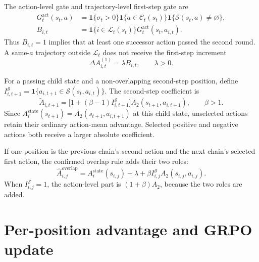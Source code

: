 \documentclass[10pt]{article}
\begin{document}
The action-level gate and trajectory-level first-step gate are
\begin{align}
G_t^{\mathrm{act}}(s_t,a)
&=\mathbf{1}\{\sigma_t>0\}
  \mathbf{1}\{a\in\mathcal C_t(s_t)\}
  \mathbf{1}\{\mathcal S(s_t,a)\neq\varnothing\},\\
B_{i,t}
&=\mathbf{1}\{i\in\mathcal L_t(s_t)\}
  G_t^{\mathrm{act}}(s_t,a_{i,t}).
\end{align}
Thus \(B_{i,t}=1\) implies that at least one successor action passed
the second round. A same-\(a\) trajectory outside \(\mathcal L_t\)
does not receive the first-step increment
\begin{equation}
\Delta A^{(1)}_{i,t}=\lambda B_{i,t},\qquad\lambda>0.
\end{equation}

For a passing child state and a non-overlapping second-step position,
define \(I^{\mathcal S}_{i,t+1}
=\mathbf{1}\{a_{i,t+1}\in\mathcal S(s_t,a_{i,t})\}\). The second-step
coefficient is
\begin{equation}
\widetilde A_{i,t+1}
=\bigl[1+(\beta-1)I^{\mathcal S}_{i,t+1}\bigr]
 A_2(s_{t+1},a_{i,t+1}),\qquad\beta>1.
\end{equation}
Since \(A_i^{\mathrm{state}}(s_{t+1})=A_2(s_{t+1},a_{i,t+1})\)
at this child state, unselected actions retain their ordinary
action-mean advantage. Selected positive and negative actions both
receive a larger absolute coefficient.

If one position is the previous chain's second action and the next
chain's selected first action, the confirmed overlap rule adds their
two roles:
\begin{equation}
\widehat A_{i,j}^{\mathrm{overlap}}
=A_i^{\mathrm{state}}(s_{i,j})+\lambda
 +\beta I^{\mathcal S}_{i,j}
 A_2(s_{i,j},a_{i,j}).
\end{equation}
When \(I^{\mathcal S}_{i,j}=1\), the action-level part is
\((1+\beta)A_2\), because the two roles are added.

\section{Per-position advantage and GRPO update}
\end{document}
